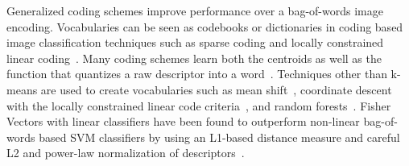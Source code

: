         Generalized coding schemes improve performance over a bag-of-words image encoding.
        Vocabularies can be seen as codebooks or dictionaries in coding based image classification techniques
          such as sparse coding and locally constrained linear coding~\cite{jurie_creating_2005, yang_linear_2009,
          yang_supervised_2010, yang_efficient_2010, wang_locality_constrained_2010}.
        Many coding schemes learn both the centroids as well as the function that quantizes a raw descriptor into
          a word~\cite{jurie_creating_2005, yang_linear_2009, yang_supervised_2010, yang_efficient_2010,
          wang_locality_constrained_2010, vedaldi_multiple_2009}.
        Techniques other than k-means are used to create vocabularies such as mean
          shift~\cite{jurie_creating_2005}, coordinate descent with the locally constrained linear code
          criteria~\cite{wang_locality_constrained_2010}, and random forests~\cite{perronnin_fisher_2007}.
        Fisher Vectors with linear classifiers have been found to outperform non-linear bag-of-words based SVM
          classifiers by using an L1-based distance measure and careful L2 and power-law normalization of
          descriptors~\cite{perronnin_improving_2010, perronnin_large_scale_2010}.






